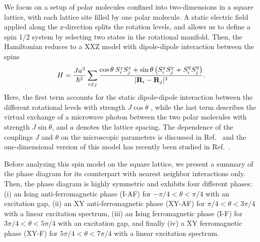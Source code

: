 We focus on a setup of polar molecules confined into two-dimensions in a square lattice,
with each lattice site filled by one polar molecule.  A static electric field applied along 
the z-direction splits the rotation levels, and allows us to define a spin 1/2 system by selecting
two states in the rotational manifold. Then, the Hamiltonian reduces to a XXZ model with dipole-dipole interaction
between the spins \cite{gorshkov11}
%
\begin{equation}
  H = \frac{ J a^3}{ \hbar^2}\sum_{i \neq j} \frac{\cos \theta \: 
S^{z}_{i}S^{z}_{j}+ \sin \theta
\left( S^{x}_{i} S^{x}_{j} + S^{y}_{i} S^{y}_{j}\right) }{|{\bf R}_{i} - {\bf R}_{j}|^3}.
\end{equation} 
%
Here, the first term accounts for the static dipole-dipole 
interaction between the different rotational levels with strength $J \cos \theta$ , while the last term 
describes the virtual exchange of a microwave photon between the two polar molecules with 
strength $J \sin \theta$, and  $a$ denotes the lattice spacing. 
The dependence of the couplings $J$ and $\theta$ on the microscopic 
parameters is discussed in Ref.~\cite{muller10,gorshkov11,gorshkov11-2} and the one-dimensional version of this model has recently been studied in Ref.~\cite{hauke10}.

Before analyzing this spin model on the square lattice, we present a
summary of the phase diagram
for its counterpart with nearest neighbor interactions only.
Then, the phase diagram is highly symmetric and
exhibits four different phases: (i) an Ising
anti-ferromagnetic phase (I-AF) for $-\pi/4 < \theta < \pi/4$ with an
excitation gap, (ii) an XY anti-ferromagnetic phase (XY-AF) for $\pi/4 < \theta
< 3\pi/4$ with a linear excitation spectrum, (iii) an Ising ferromagnetic phase
(I-F) for $3 \pi/4 < \theta < 5\pi/4$ with an excitation gap, and finally (iv) a
XY ferromagnetic phase (XY-F) for $5 \pi/4 < \theta < 7\pi/4$  with a linear
excitation spectrum.
 
